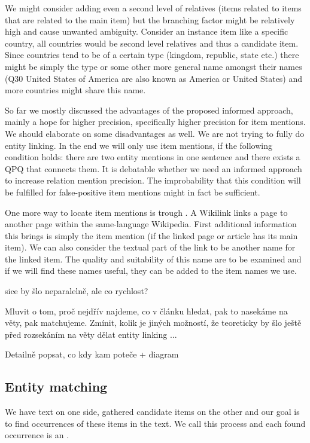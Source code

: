 We might consider adding even a second level of relatives (items related to items that are related to the main item) but the branching factor might be relatively high and cause unwanted ambiguity. Consider an instance item like a specific country, all countries would be second level relatives and thus a candidate item. Since countries tend to be of a certain type (kingdom, republic, state etc.) there might be simply the type or some other more general name amongst their names (Q30 United States of America are also known as America or United States) and more countries might share this name.

So far we mostly discussed the advantages of the proposed informed approach, mainly a hope for higher precision, specifically higher precision for item mentions. We should elaborate on some disadvantages as well. We are not trying to fully do entity linking. In the end we will only use item mentions, if the following condition holds: there are two entity mentions in one sentence and there exists a QPQ that connects them. It is debatable whether we need an informed approach to increase relation mention precision. The improbability that this condition will be fulfilled for false-positive item mentions might in fact be sufficient.

One more way to locate item mentions is trough . A Wikilink links a page to another page within the same-language Wikipedia. First additional information this brings is simply the item mention (if the linked page or article has its main item). We can also consider the textual part of the link to be another name for the linked item. The quality and suitability of this name are to be examined and if we will find these names useful, they can be added to the item names we use.



sice by šlo neparalelně, ale co rychlost?

Mluvit o tom, proč nejdřív najdeme, co v článku hledat, pak to nasekáme na věty, pak matchujeme. Zmínit, kolik je jiných možností, že teoreticky by šlo ještě před rozsekáním na věty dělat entity linking ...

Detailně popsat, co kdy kam poteče + diagram


\subsection{Entity matching}

We have text on one side, gathered candidate items on the other and our goal is to find occurrences of these items in the text. We call this process  and each found occurrence is an .

